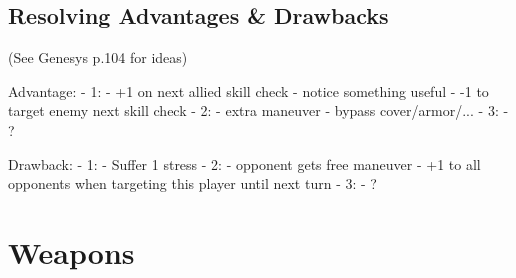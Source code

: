 



\subsection{Resolving Advantages \& Drawbacks}

(See Genesys p.104 for ideas)

Advantage:
    - 1:
        - +1 on next allied skill check
        - notice something useful
        - -1 to target enemy next skill check
    - 2:
        - extra maneuver
        - bypass cover/armor/...
    - 3:
        - ?

Drawback:
  - 1:
      - Suffer 1 stress
  - 2:
      - opponent gets free maneuver
      - +1 to all opponents when targeting this player until next turn
  - 3:
      - ?
  
\pagebreak
\section{Weapons}

\newcommand{\weapontable}[4][2]{
    {
    \protect\renewcommand{\arraystretch}{1.2}%
    \renewcommand\tabularxcolumn[1]{m{##1}} %
    \small
    \begin{threeparttable}
        \begin{tabularx}{\linewidth}{@{}m{1.0in}*{#1}{>{\centering\arraybackslash}m{0.5in}}X@{}}
            #2
            \toprule
            #3
            \bottomrule
        \end{tabularx}
        \ifthenelse{\isempty{#4}}
        {}{
            \begin{tablenotes}
                \footnotesize
                #4
            \end{tablenotes}
        }
    \end{threeparttable}
    \par
    }
}

